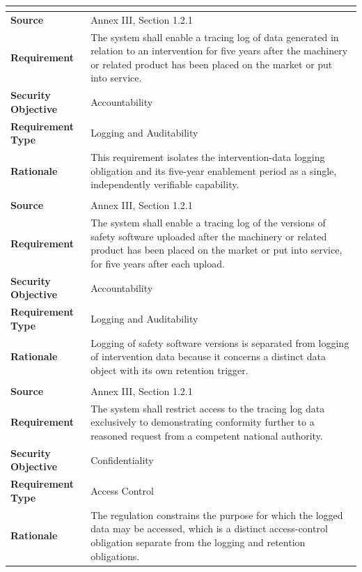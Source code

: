 \begin{longtable}{|>{\bfseries}l|p{11cm}|}
	\multicolumn{2}{|l|}{\textbf{Requirement RQ-012}} \\
	\hline
	Source & Annex III, Section 1.2.1 \\
	\hline
	Requirement & The system shall enable a tracing log of data generated in relation to an intervention for five years after the machinery or related product has been placed on the market or put into service. \\
	\hline
	Security Objective & Accountability \\
	\hline
	Requirement Type & Logging and Auditability \\
	\hline
	Rationale & This requirement isolates the intervention-data logging obligation and its five-year enablement period as a single, independently verifiable capability. \\
	\hline
	\hline
	
	\multicolumn{2}{|l|}{\textbf{Requirement RQ-013}} \\
	\hline
	Source & Annex III, Section 1.2.1 \\
	\hline
	Requirement & The system shall enable a tracing log of the versions of safety software uploaded after the machinery or related product has been placed on the market or put into service, for five years after each upload. \\
	\hline
	Security Objective & Accountability \\
	\hline
	Requirement Type & Logging and Auditability \\
	\hline
	Rationale & Logging of safety software versions is separated from logging of intervention data because it concerns a distinct data object with its own retention trigger. \\
	\hline
	\hline
	
	\multicolumn{2}{|l|}{\textbf{Requirement RQ-014}} \\
	\hline
	Source & Annex III, Section 1.2.1 \\
	\hline
	Requirement & The system shall restrict access to the tracing log data exclusively to demonstrating conformity further to a reasoned request from a competent national authority. \\
	\hline
	Security Objective & Confidentiality \\
	\hline
	Requirement Type & Access Control \\
	\hline
	Rationale & The regulation constrains the purpose for which the logged data may be accessed, which is a distinct access-control obligation separate from the logging and retention obligations. \\
	\hline
	\hline

\end{longtable}

